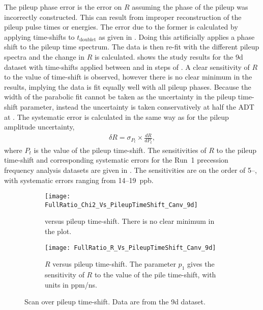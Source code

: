 The pileup phase error is the error on $R$ assuming the phase of the pileup was incorrectly constructed. This can result from improper reconstruction of the pileup pulse times or energies. The error due to the former is calculated by applying time-shifts to $t_{\text{doublet}}$ as given in . Doing this artificially applies a phase shift to the pileup time spectrum. The data is then re-fit with the different pileup spectra and the change in $R$ is calculated.  shows the study results for the 9d dataset with time-shifts applied between  and  in steps of . A clear sensitivity of $R$ to the value of time-shift is observed, however there is no clear minimum in the \chisq results, implying the data is fit equally well with all pileup phases. Because the width of the \chisq parabolic fit cannot be taken as the uncertainty in the pileup time-shift parameter, instead the uncertainty is taken conservatively at half the ADT at . The systematic error is calculated in the same way as for the pileup amplitude uncertainty,
    \begin{align}
        \delta R = \sigma_{P_{t}} \times \frac{dR}{dP_{t}},
    \end{align}
where $P_{t}$ is the value of the pileup time-shift. The sensitivities of $R$ to the pileup time-shift and corresponding systematic errors for the Run~1 precession frequency analysis datasets are given in . The sensitivities are on the order of 5--, with systematic errors ranging from 14--\SI{19}{ppb}.


\begin{figure}
\centering
    \begin{subfigure}[t]{0.45\textwidth}
        \centering
        \texttt{[image: FullRatio\_Chi2\_Vs\_PileupTimeShift\_Canv\_9d]}
        \caption{\chisq versus pileup time-shift. There is no clear minimum in the plot.} 
    \end{subfigure}%
    \hspace{1cm}
    \begin{subfigure}[t]{0.45\textwidth}
        \centering
        \texttt{[image: FullRatio\_R\_Vs\_PileupTimeShift\_Canv\_9d]}
        \caption{$R$ versus pileup time-shift. The parameter $p_{1}$ gives the sensitivity of $R$ to the value of the pile time-shift, with units in ppm/ns.}
    \end{subfigure}
\caption[Pileup time-shift scan]{Scan over pileup time-shift. Data are from the 9d dataset.}
\label{fig:PTSscan}
\end{figure}


